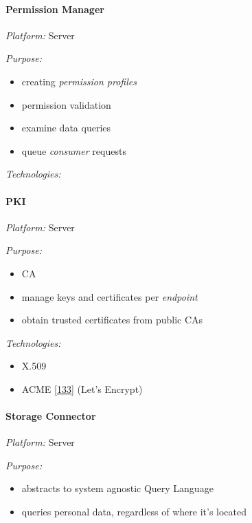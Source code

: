 \documentclass[12pt,english,a4paper,titlepage,cleardoublepage=empty,dottedtoc]{report}
\providecommand{\tightlist}{%
  \setlength{\itemsep}{0pt}\setlength{\parskip}{0pt}}
\begin{document}
\paragraph{Permission Manager}\label{permission-manager}

\emph{Platform:} Server

\emph{Purpose:}

\begin{itemize}
\tightlist
\item
  creating \emph{permission profiles}
\item
  permission validation
\item
  examine data queries
\item
  queue \emph{consumer} requests
\end{itemize}

\emph{Technologies:}

\paragraph{PKI}\label{pki}

\emph{Platform:} Server

\emph{Purpose:}

\begin{itemize}
\tightlist
\item
  CA
\item
  manage keys and certificates per \emph{endpoint}
\item
  obtain trusted certificates from public CAs
\end{itemize}

\emph{Technologies:}

\begin{itemize}
\tightlist
\item
  X.509
\item
  ACME {[}\protect\hyperlink{ref-web_spec_acme}{133}{]} (Let's Encrypt)
\end{itemize}

\paragraph{Storage Connector}\label{storage-connector}

\emph{Platform:} Server

\emph{Purpose:}

\begin{itemize}
\tightlist
\item
  abstracts to system agnostic Query Language
\item
  queries personal data, regardless of where it's located
\end{itemize}
\end{document}
